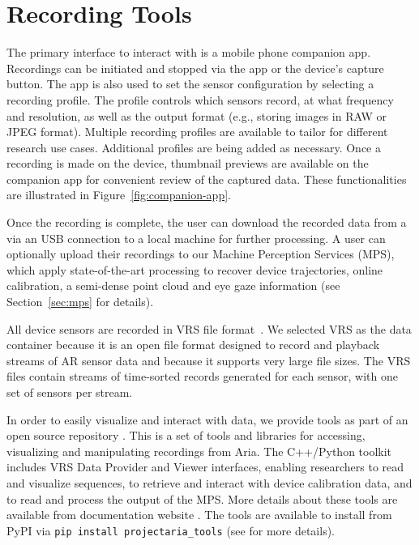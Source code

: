 \section{Recording Tools}
\label{sec:recordingtools}

The primary interface to interact with \AriaDevices{} is a mobile phone companion app. Recordings can be initiated and stopped via the app or the device's capture button.
The app is also used to set the sensor configuration by selecting a recording profile. The profile controls which sensors record, at what frequency and resolution, as well as the output format (e.g., storing images in RAW or JPEG format). 
Multiple recording profiles are available to tailor for different research use cases. Additional profiles are being added as necessary. Once a recording is made on the device, thumbnail previews are available on the companion app for convenient review of the captured data. These functionalities are illustrated in Figure~\ref{fig:companion-app}.


Once the recording is complete, the user can download the recorded data from a \AriaDevice{} via an USB connection to a local machine for further processing. A user can optionally upload their recordings to our Machine Perception Services (MPS), which apply state-of-the-art processing to recover device trajectories, online calibration, a semi-dense point cloud and eye gaze information (see Section~\ref{sec:mps} for details).

All device sensors are recorded in VRS file format~\cite{vrsdocs}.  We selected VRS as the data container because it is an open file format designed to record and playback streams of AR sensor data and because it supports very large file sizes. The VRS files contain streams of time-sorted records generated for each sensor, with one set of sensors per stream.

In order to easily visualize and interact with data, we provide \ProjectAria{} tools as part of an open source repository \cite{ariatools}. This is a set of tools and libraries for accessing, visualizing and manipulating recordings from Aria. The C++/Python toolkit includes VRS Data Provider and Viewer interfaces, enabling researchers to read and visualize \ProjectAria{} sequences, to retrieve and interact with device calibration data, and to read and process the output of the MPS.
More details about these tools are available from documentation website \cite{ariadocs}.
The \ProjectAria{} tools are available to install from PyPI via
{\tt pip install projectaria\_tools} (see \cite{ariatools} for more details).


